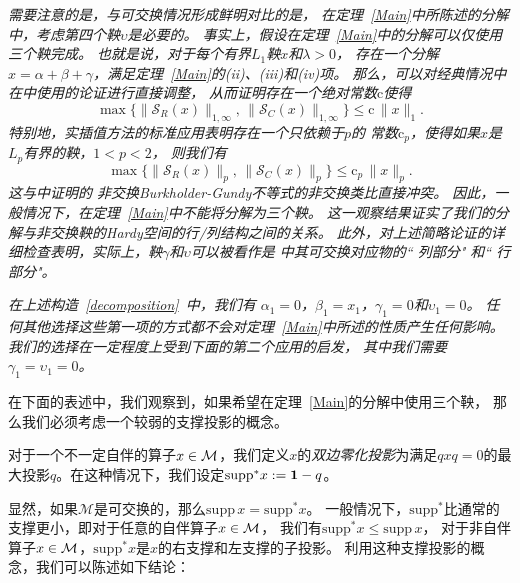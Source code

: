 
\begin{remark}
\emph{需要注意的是，与可交换情况形成鲜明对比的是，
在定理~\ref{Main}中所陈述的分解中，考虑第四个鞅$\upsilon$是必要的。
事实上，假设在定理~\ref{Main}中的分解可以仅使用三个鞅完成。
也就是说，对于每个有界$L_1$鞅$x$和$\lambda>0$，
存在一个分解$x=\alpha +\beta +\gamma$，满足定理~\ref{Main}的(ii)、(iii)和(iv)项。
那么，可以对经典情况中在\cite{G}中使用的论证进行直接调整，
从而证明存在一个绝对常数$\mathrm{c}$使得 $$\max \Big\{
\|\mathcal{S}_R(x)\|_{1,\infty}, \,
\|\mathcal{S}_C(x)\|_{1,\infty} \Big\} \leq \mathrm{c} \,
\|x\|_1.$$ 特别地，实插值方法的标准应用表明存在一个只依赖于$p$的
常数$\mathrm{c}_p$，使得如果$x$是$L_p$有界的鞅，$1 < p < 2$，
则我们有 $$\max \Big\{ \|\mathcal{S}_R(x)\|_{p},
\, \|\mathcal{S}_C(x)\|_{p} \Big\} \leq \mathrm{c}_p \, \|x\|_p.$$ 这与\cite{PX1}中证明的
非交换Burkholder-Gundy不等式的非交换类比直接冲突。
因此，一般情况下，在定理~\ref{Main}中不能将分解为三个鞅。
这一观察结果证实了我们的分解与非交换鞅的Hardy空间的行/列结构之间的关系。
此外，对上述简略论证的详细检查表明，实际上，鞅$\gamma$和$\upsilon$可以被看作是
\cite{G}中其可交换对应物的“ 列部分" 和“ 行部分"。}
\end{remark}

\begin{remark}
\emph{在上述构造~\eqref{decomposition}~中，我们有
$\alpha_1=0$，$\beta_1= x_1$，$\gamma_1=0$和$\upsilon_1=0$。
任何其他选择这些第一项的方式都不会对定理~\ref{Main}中所述的性质产生任何影响。
我们的选择在一定程度上受到下面的第二个应用的启发，
其中我们需要$\gamma_1 = \upsilon_1 = 0$。}
\end{remark}

在下面的表述中，我们观察到，如果希望在定理~\ref{Main}的分解中使用三个鞅，
那么我们必须考虑一个较弱的支撑投影的概念。

\begin{definition}
对于一个不一定自伴的算子$x \in \mathcal{M}$，我们定义$x$的\emph{双边零化投影}为满足$qxq = 0$的最大投影$q$。在这种情况下，我们设定$\mbox{supp}^* x := {\bf 1} - q$。
\end{definition}

显然，如果$\mathcal{M}$是可交换的，那么$\mbox{supp} \, x = \mbox{supp}^* x$。
一般情况下，$\mbox{supp}^*$比通常的支撑更小，即对于任意的自伴算子$x \in \mathcal{M}$，
我们有$\mbox{supp}^* x \le \mbox{supp} \, x$，
对于非自伴算子$x \in \mathcal{M}$，$\mbox{supp}^* x$是$x$的右支撑和左支撑的子投影。
利用这种支撑投影的概念，我们可以陈述如下结论：

